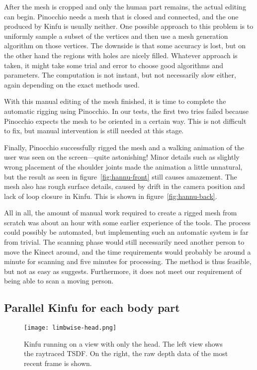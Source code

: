 After the mesh is cropped and only the human part remains, the actual editing can begin. Pinocchio needs a mesh that is closed and connected, and the one produced by Kinfu is usually neither. One possible approach to this problem is to uniformly sample a subset of the vertices and then use a mesh generation algorithm on those vertices. The downside is that some accuracy is lost, but on the other hand the regions with holes are nicely filled. Whatever approach is taken, it might take some trial and error to choose good algorithms and parameters. The computation is not instant, but not necessarily slow either, again depending on the exact methods used.

With this manual editing of the mesh finished, it is time to complete the automatic rigging using Pinocchio. In our tests, the first two tries failed because Pinocchio expects the mesh to be oriented in a certain way. This is not difficult to fix, but manual intervention is still needed at this stage.

Finally, Pinocchio successfully rigged the mesh and a walking animation of the user was seen on the screen---quite astonishing! Minor details such as slightly wrong placement of the shoulder joints made the animation a little unnatural, but the result as seen in figure~\ref{fig:hannu-front} still causes amazement. The mesh also has rough surface details, caused by drift in the camera position and lack of loop closure in Kinfu. This is shown in figure~\ref{fig:hannu-back}.

All in all, the amount of manual work required to create a rigged mesh from scratch was about an hour with some earlier experience of the tools. The process could possibly be automated, but implementing such an automatic system is far from trivial. The scanning phase would still necessarily need another person to move the Kinect around, and the time requirements would probably be around a minute for scanning and five minutes for processing. The method is thus feasible, but not as easy as \citet{charpentier2011accurate} suggests. Furthermore, it does not meet our requirement of being able to scan a moving person.

\subsection{Parallel Kinfu for each body part} \label{approach.parallel}

\begin{figure}
    \centering
    \texttt{[image: limbwise-head.png]}
    \caption{Kinfu running on a view with only the head. The left view shows the raytraced TSDF. On the right, the raw depth data of the most recent frame is shown.}
    \label{fig:limbwise-head}
\end{figure}


